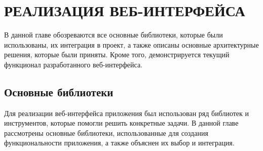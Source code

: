 \chapter{\MakeUppercase{Реализация веб-интерфейса}}


В данной главе обозреваются все основные библиотеки, которые были использованы, их интеграция в проект, а также описаны основные архитектурные решения, которые были приняты. Кроме того, демонстрируется текущий функционал разработанного веб-интерфейса.

\section{Основные библиотеки}

Для реализации веб-интерфейса приложения был использован ряд библиотек и инструментов, которые помогли решить конкретные задачи. В данной главе рассмотрены основные библиотеки, использованные для создания функциональности приложения, а также объяснен их выбор и интеграция.

